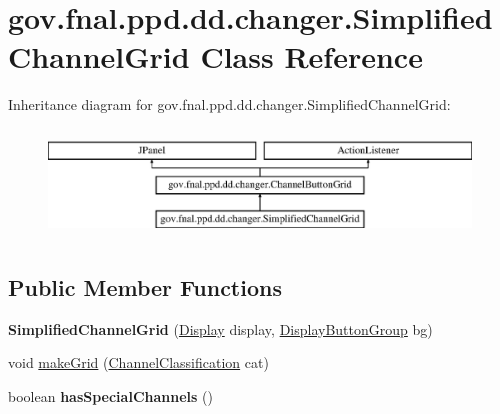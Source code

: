 \hypertarget{classgov_1_1fnal_1_1ppd_1_1dd_1_1changer_1_1SimplifiedChannelGrid}{\section{gov.\-fnal.\-ppd.\-dd.\-changer.\-Simplified\-Channel\-Grid Class Reference}
\label{classgov_1_1fnal_1_1ppd_1_1dd_1_1changer_1_1SimplifiedChannelGrid}
}
Inheritance diagram for gov.\-fnal.\-ppd.\-dd.\-changer.\-Simplified\-Channel\-Grid\-:\begin{figure}[H]
\begin{center}
\leavevmode
\includegraphics[height=2.906574cm]{classgov_1_1fnal_1_1ppd_1_1dd_1_1changer_1_1SimplifiedChannelGrid}
\end{center}
\end{figure}
\subsection*{Public Member Functions}
\begin{DoxyCompactItemize}
\item 
\hypertarget{classgov_1_1fnal_1_1ppd_1_1dd_1_1changer_1_1SimplifiedChannelGrid_a4406e3f9361d9f1650d55318db73f672}{{\bfseries Simplified\-Channel\-Grid} (\hyperlink{interfacegov_1_1fnal_1_1ppd_1_1dd_1_1signage_1_1Display}{Display} display, \hyperlink{classgov_1_1fnal_1_1ppd_1_1dd_1_1util_1_1DisplayButtonGroup}{Display\-Button\-Group} bg)}\label{classgov_1_1fnal_1_1ppd_1_1dd_1_1changer_1_1SimplifiedChannelGrid_a4406e3f9361d9f1650d55318db73f672}

\item 
void \hyperlink{classgov_1_1fnal_1_1ppd_1_1dd_1_1changer_1_1SimplifiedChannelGrid_aabe867c92d6955829fc0b2e0cf9192db}{make\-Grid} (\hyperlink{classgov_1_1fnal_1_1ppd_1_1dd_1_1changer_1_1ChannelClassification}{Channel\-Classification} cat)
\item 
\hypertarget{classgov_1_1fnal_1_1ppd_1_1dd_1_1changer_1_1SimplifiedChannelGrid_a16bc62ae47eb1a4c6af07eeb9eac4eca}{boolean {\bfseries has\-Special\-Channels} ()}\label{classgov_1_1fnal_1_1ppd_1_1dd_1_1changer_1_1SimplifiedChannelGrid_a16bc62ae47eb1a4c6af07eeb9eac4eca}

\end{DoxyCompactItemize}
